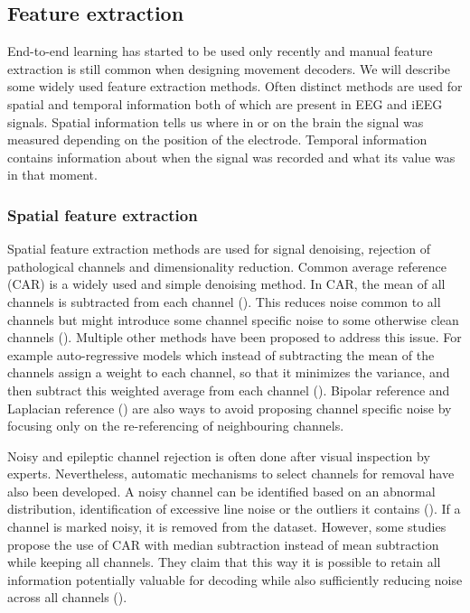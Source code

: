 \subsection{Feature extraction}
End-to-end learning has started to be used only recently and manual feature extraction is still common when designing movement decoders.
We will describe some widely used feature extraction methods. 
Often distinct methods are used for spatial and temporal information both of which are present in EEG and iEEG signals. 
Spatial information tells us where in or on the brain the signal was measured depending on the position of the electrode.
Temporal information contains information about when the signal was recorded and what its value was in that moment.
\subsubsection{Spatial feature extraction}
Spatial feature extraction methods are used for signal denoising, rejection of pathological channels and dimensionality reduction.
 Common average reference (CAR) is a widely used and simple denoising method.
 In CAR, the mean of all channels is subtracted from each channel (\cite{liu-effects-2015}). 
 This reduces noise common to all channels but might introduce some channel specific noise to some otherwise clean channels (\cite{volkova-review}). 
 Multiple other methods have been proposed to address this issue.
 For example auto-regressive models which instead of subtracting the mean of the channels assign a weight to each channel, so that it minimizes the variance, and then subtract this weighted average from each channel (\cite{adaptive-laplacian-reference}).
 Bipolar reference and Laplacian reference (\cite{yao2019reference, laplacian-reference}) are also ways to avoid proposing channel specific noise by focusing only on the re-referencing of neighbouring channels.
 
 
Noisy and epileptic channel rejection is often done after visual inspection by experts. Nevertheless, automatic mechanisms to select channels for removal have also been developed. A noisy channel can be identified based on an abnormal distribution, identification of excessive line noise or the outliers it contains (\cite{liu-effects-2015}). If a channel is marked noisy, it is removed from the dataset. However, some studies propose the use of CAR with median subtraction instead of mean subtraction while keeping all channels. They claim that this way it is possible to retain all information potentially valuable for decoding while also sufficiently reducing noise across all channels (\cite{liu-effects-2015}). 

